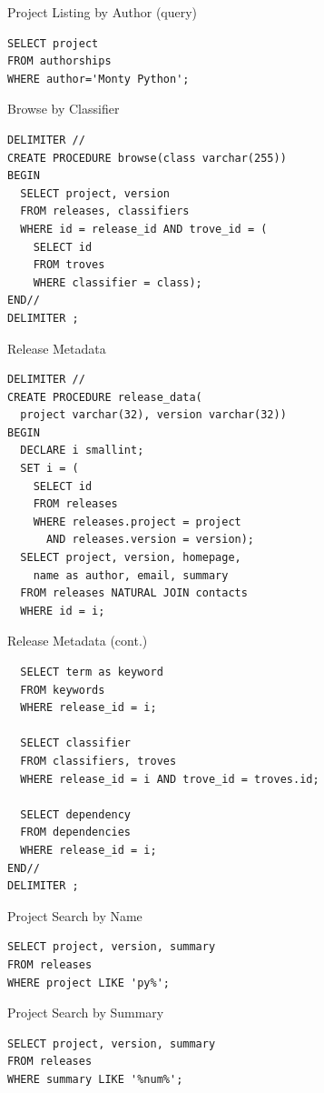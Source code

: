 \documentclass[pdf]{beamer}
\begin{document}
\begin{frame}[fragile]{Project Listing by Author (query)}\Large
\begin{verbatim}
SELECT project
FROM authorships
WHERE author='Monty Python';
\end{verbatim}
\end{frame}

\begin{frame}[fragile]{Browse by Classifier}\large
\begin{verbatim}
DELIMITER //
CREATE PROCEDURE browse(class varchar(255))
BEGIN
  SELECT project, version
  FROM releases, classifiers
  WHERE id = release_id AND trove_id = (
    SELECT id
    FROM troves
    WHERE classifier = class);
END//
DELIMITER ;
\end{verbatim}
\end{frame}

\begin{frame}[fragile]{Release Metadata}
\begin{verbatim}
DELIMITER //
CREATE PROCEDURE release_data(
  project varchar(32), version varchar(32))
BEGIN
  DECLARE i smallint;
  SET i = (
    SELECT id
    FROM releases
    WHERE releases.project = project
      AND releases.version = version);
  SELECT project, version, homepage,
    name as author, email, summary
  FROM releases NATURAL JOIN contacts
  WHERE id = i;
\end{verbatim}
\end{frame}

\begin{frame}[fragile]{Release Metadata (cont.)}
\begin{verbatim}
  SELECT term as keyword
  FROM keywords
  WHERE release_id = i;

  SELECT classifier
  FROM classifiers, troves
  WHERE release_id = i AND trove_id = troves.id;

  SELECT dependency
  FROM dependencies
  WHERE release_id = i;
END//
DELIMITER ;
\end{verbatim}
\end{frame}

\begin{frame}[fragile]{Project Search by Name}\Large
\begin{verbatim}
SELECT project, version, summary
FROM releases
WHERE project LIKE 'py%';
\end{verbatim}
\end{frame}

\begin{frame}[fragile]{Project Search by Summary}\Large
\begin{verbatim}
SELECT project, version, summary
FROM releases
WHERE summary LIKE '%num%';
\end{verbatim}
\end{frame}
\end{document}
